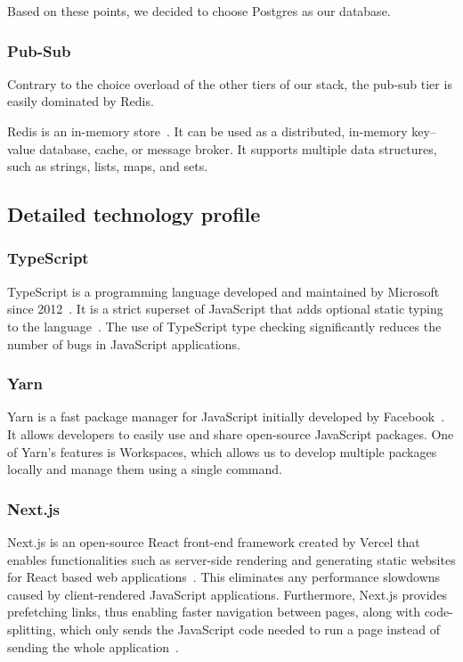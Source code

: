 Based on these points, we decided to choose Postgres as our database.

\subsubsection{Pub-Sub}

Contrary to the choice overload of the other tiers of our stack, the pub-sub tier is easily dominated by Redis.

Redis is an in-memory store~\autocite{noauthor_faq_nodate}. It can be used as a distributed, in-memory key–value database, cache, or message broker. It supports multiple data structures, such as strings, lists, maps, and sets.

\subsection{Detailed technology profile}

\subsubsection{TypeScript}

TypeScript is a programming language developed and maintained by Microsoft since 2012~\autocite{staff_microsoft_2012}.
It is a strict superset of JavaScript that adds optional static typing to the language~\autocite{noauthor_typed_nodate}.
The use of TypeScript type checking significantly reduces the number of bugs in JavaScript applications.

\subsubsection{Yarn}

Yarn is a fast package manager for JavaScript initially developed by Facebook~\autocite{noauthor_yarn:_2016}. It allows developers to easily use and share open-source JavaScript packages. One of Yarn's features is Workspaces, which allows us to develop multiple packages locally and manage them using a single command.

\subsubsection{Next.js}

Next.js is an open-source React front-end framework created by Vercel that enables functionalities such as server-side rendering and generating static websites for React based web applications~\autocite{noauthor_next.js_nodate}.
This eliminates any performance slowdowns caused by client-rendered JavaScript applications.
Furthermore, Next.js provides prefetching links, thus enabling faster navigation between pages, along with code-splitting, which only sends the JavaScript code needed to run a page instead of sending the whole application~\autocite{noauthor_next.js_nodate}.

